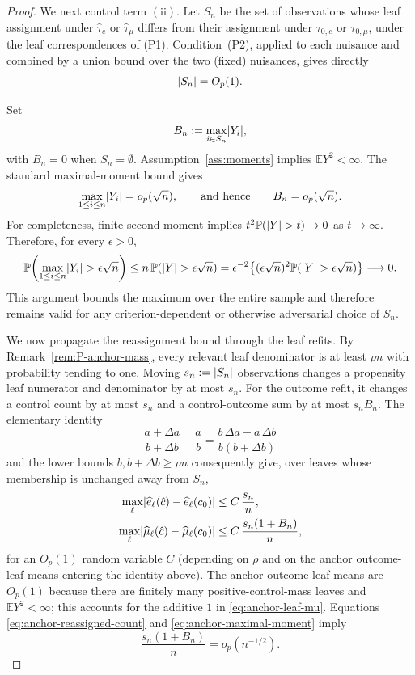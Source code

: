 \documentclass[11pt]{article}
\theoremstyle{plain}
\theoremstyle{definition}
\theoremstyle{remark}
\newcommand{\E}{\mathbb{E}}
\newcommand{\PP}{\mathbb{P}}
\DeclarePairedDelimiter{\abs}{\lvert}{\rvert}
\DeclarePairedDelimiter{\card}{\lvert}{\rvert}
\begin{document}
\begin{proof}
We next control term $\mathrm{(ii)}$. Let $S_n$ be the set of observations
whose leaf assignment under $\hat\tau_e$ or $\hat\tau_\mu$ differs from their
assignment under $\tau_{0,e}$ or $\tau_{0,\mu}$, under the leaf
correspondences of (P1). Condition~(P2), applied to each nuisance and
combined by a union bound over the two (fixed) nuisances, gives directly
\begin{equation}\label{eq:anchor-reassigned-count}
  \card{S_n}=O_p(1).
\end{equation}

Set
\[
  B_n:=\max_{i\in S_n}\abs{Y_i},
\]
with $B_n=0$ when $S_n=\emptyset$. Assumption~\ref{ass:moments} implies
$\E Y^2<\infty$. The standard maximal-moment bound gives
\begin{equation}\label{eq:anchor-maximal-moment}
  \max_{1\le i\le n}\abs{Y_i}=o_p(\sqrt n),
  \qquad\text{and hence}\qquad
  B_n=o_p(\sqrt n).
\end{equation}
For completeness, finite second moment implies
$t^2\PP(\abs Y>t)\to0$ as $t\to\infty$. Therefore, for every $\epsilon>0$,
\[
  \PP\!\left(\max_{1\le i\le n}\abs{Y_i}>
  \epsilon\sqrt n\right)
  \le
  n\,\PP(\abs Y>\epsilon\sqrt n)
  =
  \epsilon^{-2}
  \bigl\{(\epsilon\sqrt n)^2
  \PP(\abs Y>\epsilon\sqrt n)\bigr\}
  \longrightarrow0.
\]
This argument bounds the maximum over the entire sample and therefore remains
valid for any criterion-dependent or otherwise adversarial choice of $S_n$.

We now propagate the reassignment bound through the leaf refits. By
Remark~\ref{rem:P-anchor-mass}, every relevant leaf denominator is
at least $\rho n$ with probability tending to one. Moving
$s_n:=\card{S_n}$ observations changes a propensity leaf numerator and
denominator by at most $s_n$. For the outcome refit, it changes a control
count by at most $s_n$ and a control-outcome sum by at most $s_nB_n$.
The elementary identity
\[
  \frac{a+\Delta a}{b+\Delta b}-\frac ab
  =
  \frac{b\,\Delta a-a\,\Delta b}
       {b(b+\Delta b)}
\]
and the lower bounds $b,b+\Delta b\ge\rho n$ consequently give, over leaves
whose membership is unchanged away from $S_n$,
\begin{align}
  \max_\ell
  \abs{\widehat e_\ell(\hat c)-\widehat e_\ell(c_0)}
  &\le C\,\frac{s_n}{n}, \label{eq:anchor-leaf-e}\\
  \max_\ell
  \abs{\widehat\mu_\ell(\hat c)-\widehat\mu_\ell(c_0)}
  &\le C\,\frac{s_n(1+B_n)}{n}, \label{eq:anchor-leaf-mu}
\end{align}
for an $O_p(1)$ random variable $C$ (depending on $\rho$ and on the anchor
outcome-leaf means entering the identity above). The anchor outcome-leaf
means are $O_p(1)$ because there are finitely many positive-control-mass
leaves and $\E Y^2<\infty$; this accounts for the additive $1$ in
\eqref{eq:anchor-leaf-mu}. Equations
\eqref{eq:anchor-reassigned-count} and \eqref{eq:anchor-maximal-moment} imply
\begin{equation}\label{eq:anchor-leaf-rate}
  \frac{s_n(1+B_n)}{n}=o_p(n^{-1/2}).
\end{equation}


\end{proof}
\end{document}
